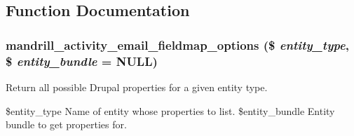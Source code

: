 \subsection{Function Documentation}
\hypertarget{mandrill__activity_8admin_8inc_a7d6b22f7626200011561acf11e8b3f24}{
\subsubsection[{mandrill\_\-activity\_\-email\_\-fieldmap\_\-options}]{\setlength{\rightskip}{0pt plus 5cm}mandrill\_\-activity\_\-email\_\-fieldmap\_\-options (\$ {\em entity\_\-type}, \/  \$ {\em entity\_\-bundle} = {\ttfamily NULL})}}
\label{mandrill__activity_8admin_8inc_a7d6b22f7626200011561acf11e8b3f24}
Return all possible Drupal properties for a given entity type.

\$entity\_\-type Name of entity whose properties to list.  \$entity\_\-bundle Entity bundle to get properties for.

